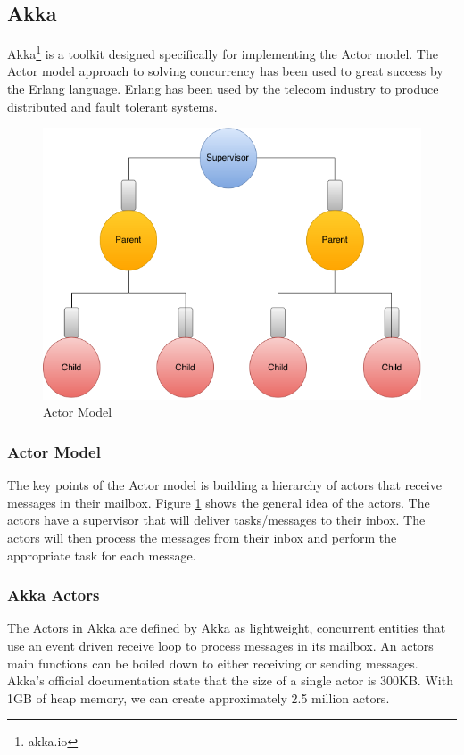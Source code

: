\subsection{Akka} 
Akka\footnote{akka.io}\cite{akka-documentation} is a toolkit designed specifically for implementing the Actor model. The Actor model approach to solving concurrency has been used to great success by the Erlang language. Erlang has been used by the telecom industry to produce distributed and fault tolerant systems. 

\begin{figure}[h]
	\centering
	\includegraphics[scale=0.4]{images/tools/ActorModel.png} 
	\caption{Actor Model}
	\label{fig:ActorModel}
\end{figure}
\subsubsection{Actor Model}
The key points of the Actor model is building a hierarchy of  actors that receive messages in their mailbox. Figure \ref{fig:ActorModel} shows the general idea of the actors. The actors have a supervisor that will deliver tasks/messages to their inbox. The actors will then process the messages from their inbox and perform the appropriate task for each message. 
\subsubsection{Akka Actors}
The Actors in Akka are defined by Akka as lightweight, concurrent entities that use an event driven receive loop to process messages in its mailbox. An actors main functions can be boiled down to either receiving or sending messages. Akka's official documentation state that the size of a single actor is 300KB. With 1GB of heap memory, we can create approximately 2.5 million actors. 

